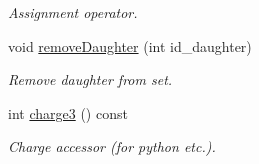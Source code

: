\begin{DoxyCompactItemize}
\begin{DoxyCompactList}\small\item\em Assignment operator. \item\end{DoxyCompactList}\item 
void \hyperlink{class_d_d4hep_1_1_simulation_1_1_geant4_particle_a2a31cd8bf99c6073484ff0750c38b67c}{removeDaughter} (int id\_\-daughter)
\begin{DoxyCompactList}\small\item\em Remove daughter from set. \item\end{DoxyCompactList}\item 
int \hyperlink{class_d_d4hep_1_1_simulation_1_1_geant4_particle_a4ae9c77141a25cf956f54ace66238bbc}{charge3} () const 
\begin{DoxyCompactList}\small\item\em Charge accessor (for python etc.). \item\end{DoxyCompactList}\end{DoxyCompactItemize}
